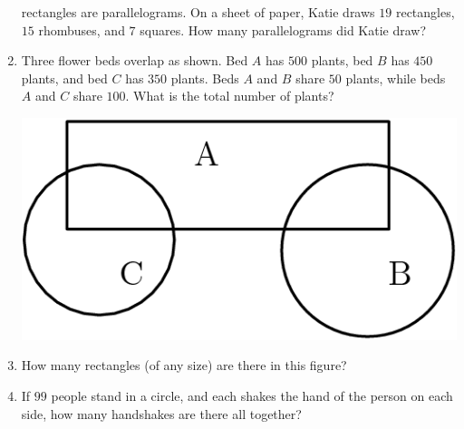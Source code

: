 \documentclass{article}
\begin{document}
\begin{enumerate}
    rectangles are parallelograms. On a sheet of paper, Katie draws $19$ 
    rectangles, $15$ rhombuses, and $7$ squares. How many parallelograms 
    did Katie draw?
    \vspace{3cm}
    \item Three flower beds overlap as shown.
        Bed $A$ has $500$ plants, bed $B$ has $450$ plants, and bed $C$ has $350$ plants.
        Beds $A$ and $B$ share $50$ plants, while beds $A$ and $C$ share $100$.
        What is the total number of plants?
        \begin{center}
            \includegraphics[scale=0.25]{flower-bed.png}
        \end{center}
        \vspace{3cm}
    \item How many rectangles (of any size) are there in this figure?
        \begin{center}
        \end{center}
        \vspace{3cm}
    \item If $99$ people stand in a circle, and each shakes the hand of the 
		person on each side, how many handshakes are there all together?
		\vspace{3cm}
\end{enumerate}
\end{document}
